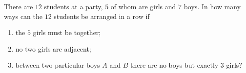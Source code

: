 There are $12$ students at a party, $5$ of whom are girls and $7$ boys. In how many ways can the $12$ students be arranged in a row if
\begin{enumerate}
\item[(i)] the $5$ girls must be together;
\item[(ii)] no two girls are adjacent;
\item[(iii)] between two particular boys $A$ and $B$ there are no boys but exactly $3$ girls?
\end{enumerate}
